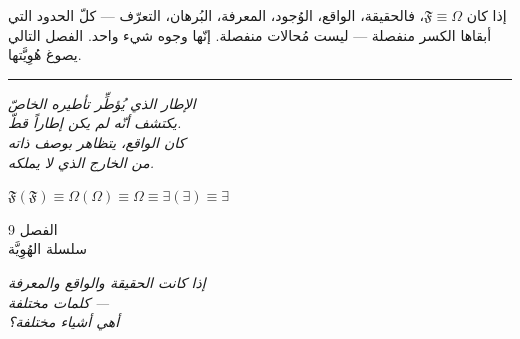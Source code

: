 \documentclass[10pt, openany, oneside]{book}
\renewcommand{\large}{\fontsize{11.5}{14}\selectfont}
\renewcommand{\huge}{\fontsize{17}{21}\selectfont}
\begin{document}
إذا كان $\mathfrak{F} \equiv \Omega$، فالحقيقة، الواقع، الوُجود، المعرفة، البُرهان، التعرّف --- كلّ الحدود التي أبقاها الكسر منفصلة --- ليست مُحالات منفصلة. إنّها وجوه شيء واحد. الفصل التالي يصوغ هُوِيَّتها.

\vspace{2em}

\begin{center}
    \rule{0.15\textwidth}{0.3pt}
\end{center}

\vspace{0.5em}

\begin{center}
    \itshape
    الإطار الذي يُؤطِّر تأطيره الخاصّ\\
    يكتشف أنّه لم يكن إطاراً قطّ.\\[0.8em]
    كان الواقع، يتظاهر بوصف ذاته\\
    من الخارج الذي لا يملكه.
\end{center}

\vspace{0.5em}

\begin{center}
    $\mathfrak{F}(\mathfrak{F}) \equiv \Omega(\Omega) \equiv \Omega \equiv \exists(\exists) \equiv \exists$
\end{center}

%
%
%

\newpage

\begin{center}
    {\huge الفصل 9}\\[0.3em]
    {\large سلسلة الهُوِيَّة}
\end{center}

\vspace{1.5em}

\begin{center}
    \itshape
    إذا كانت الحقيقة والواقع والمعرفة\\
    كلمات مختلفة ---\\
    أهي أشياء مختلفة؟
\end{center}

\vspace{2em}

\end{document}

